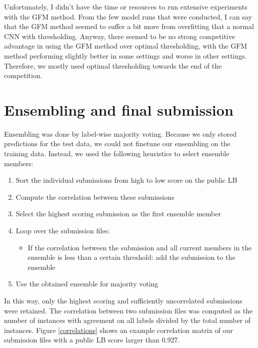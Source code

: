 \documentclass[fleqn]{homework}
\begin{document}
Unfortunately, I didn't have the time or resources to run extensive experiments with the GFM method. From the few model runs that were conducted, I can say that the GFM method seemed to suffer a bit more from overfitting that a normal CNN with thresholding. Anyway, there seemed to be no strong competitive advantage in using the GFM method over optimal thresholding, with the GFM method performing slightly better in some settings and worse in other settings. Therefore, we mostly used optimal thresholding towards the end of the competition.


\section{Ensembling and final submission}
Ensembling was done by label-wise majority voting. Because we only stored predictions for the test data, we could not finetune our ensembling on the training data. Instead, we used the following heuristics to select ensemble members: 
\begin{enumerate}
\item{Sort the individual submissions from high to low score on the public LB}
\item{Compute the correlation between these submissions}
\item{Select the highest scoring submission as the first ensemble member}
\item{Loop over the submission files:
\begin{itemize}
\item{If the correlation between the submission and all current members in the ensemble is less than a certain threshold: add the submission to the ensemble}
\end{itemize}}
\item{Use the obtained ensemble for majority voting}
\end{enumerate}

In this way, only the highest scoring and sufficiently uncorrelated submissions were retained. The correlation between two submission files was computed as the number of instances with agreement on all labels divided by the total number of instances. Figure \ref{correlations} shows an example correlation matrix of our submission files with a public LB score larger than 0.927.
\end{document}
